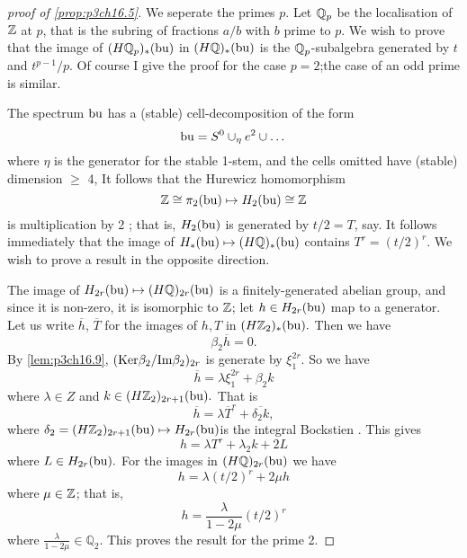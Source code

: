 \documentclass[../main]{subfiles}
\begin{document}
\begin{proof}[proof of \ref{prop:p3ch16.5}] We seperate the primes $p$. Let $\mathbb{Q}_p$ be the localisation of $\mathbb{Z}$ at $p$, that is the subring of fractions $a/b$ with $b$ prime to $p$. We wish to prove that the image of $(H\mathbb{Q}_{p})_{\ast}(\mathrm{bu})$ in $(H\mathbb{Q})_{\ast}(\mathrm{bu})$ is the $\mathbb{Q}_{p}$-subalgebra generated by $t$ and $t^{p-1}/p$. Of course I give the proof for the case $p=2$;the case of an odd prime is similar.

The spectrum $\mathrm{bu}$ has a (stable) cell-decomposition of the form \begin{equation*}
    \mathrm{bu}=S^{0}\cup_{\eta}e^{2}\cup\dots
\end{equation*}
where $\eta$ is the generator for the stable 1-stem, and the cells omitted have (stable) dimension $\geq$ 4, It follows that the Hurewicz homomorphism \begin{equation*}
    \mathbb{Z} \cong \pi_{2}(\mathrm{bu}) \mapsto H_{2}(\mathrm{bu}) \cong \mathbb{Z}
\end{equation*}
is multiplication by 2 ; that is, $H_{2}(\mathrm{bu})$ is generated by $t/2=T$, say. It follows immediately that the image of $H_{\ast}(\mathrm{bu}) \mapsto (H\mathbb{Q})_{\ast}(\mathrm{bu})$ contains $T^{r}=(t/2)^{r}.$ We wish to prove a result in the opposite direction.

The image of $H_{2r}(\mathrm{bu})\mapsto (H\mathbb{Q})_{2r}(\mathrm{bu})$ is a finitely-generated abelian group, and since it is non-zero, it is isomorphic to $\mathbb{Z}$; let $h\in H_{2r}(\mathrm{bu}) $ map to a generator. Let us write $\overline{h}$, $\overline{T}$ for the images of $h, T$ in $(H\mathbb{Z}_2)_{\ast}(\mathrm{bu}).$ Then we have \begin{equation*}
    \beta_{2}\overline{h}=0 .
\end{equation*}
By \ref{lem:p3ch16.9}, $(\mathrm{Ker}\beta_{2}/\mathrm{Im}\beta_{2})_{2r}$ is generate by $\xi_{1}^{2r}$. So we have \begin{equation*}
    \overline{h}= \lambda \xi_{1}^{2r}+\beta_{2}k
\end{equation*}
where $\lambda \in Z$ and $k\in (H\mathbb{Z}_2)_{2r+1}(\mathrm{bu}).$ That is \begin{equation*}
    \overline{h}= \lambda\overline{T}^{r}+\overline{\delta_{2}k}, 
\end{equation*}
where  $\delta_{2}=(H\mathbb{Z}_2)_{2r+1}(\mathrm{bu})\mapsto H_{2r}(\mathrm{bu})$is the integral Bockstien . This gives \begin{equation*}
    h=\lambda T^{r}+\lambda_{2}k+2L 
\end{equation*}
where $L\in H_{2r}(\mathrm{bu}).$ For the images in $(H\mathbb{Q})_{2r}(\mathrm{bu})$ we have \begin{equation*}
    h=\lambda(t/2)^{r}+2\mu h
\end{equation*}
where $\mu \in \mathbb{Z}$; that is, \begin{equation*}
    h=\frac{\lambda}{1-2\mu}(t/2)^{r}
\end{equation*}
where $\frac{\lambda}{1-2\mu}\in \mathbb{Q}_{2}$. This proves the result for the prime 2. 
\end{proof}
\end{document}
